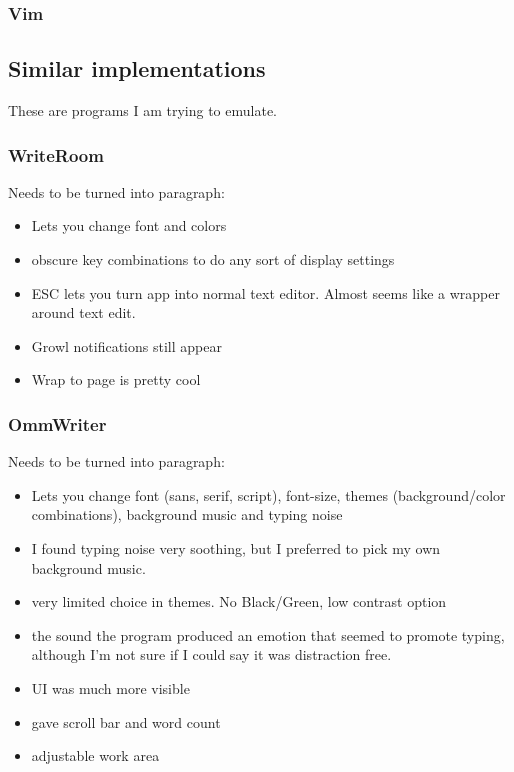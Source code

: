 \documentclass[11pt]{article}
\begin{document}
\subsubsection{Vim}

\subsection{Similar implementations}

These are programs I am trying to emulate.

\subsubsection{WriteRoom}

Needs to be turned into paragraph:

\begin{itemize}
\item Lets you change font and colors
\item obscure key combinations to do any sort of display settings
\item ESC lets you turn app into normal text editor. Almost seems like a wrapper around text edit.
\item Growl notifications still appear
\item Wrap to page is pretty cool
\end{itemize}

\subsubsection{OmmWriter}

Needs to be turned into paragraph:

\begin{itemize}
\item Lets you change font (sans, serif, script), font-size, themes (background/color combinations), background music and typing noise
\item I found typing noise very soothing, but I preferred to pick my own background music.
\item very limited choice in themes. No Black/Green, low contrast option
\item the sound the program produced an emotion that seemed to promote typing, although I'm not sure if I could say it was distraction free.
\item UI was much more visible
\item gave scroll bar and word count
\item adjustable work area
\end{itemize}
\end{document}
